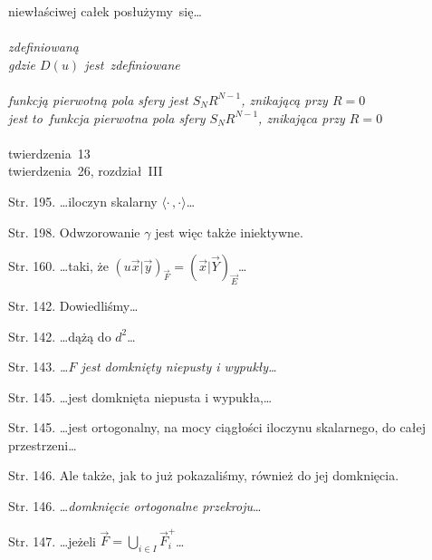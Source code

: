 \documentclass[a4paper,11pt]{article}
\numberwithin{equation}{section}
\begin{document}
\Powin niewłaściwej całek posłużymy~się\ldots \\
 \\
\Jest  \textit{zdefiniowaną} \\
\Powin \textit{gdzie $D( u )$ jest~zdefiniowane} \\
 \\
\Jest  \textit{funkcją pierwotną pola sfery jest $S_{ N } R^{ N - 1 }$,
  znikającą przy $R = 0$} \\
\Powin \textit{jest to~funkcja pierwotna pola sfery
  $S_{ N } R^{ N - 1 }$,
  znikająca przy $R = 0$} \\
 \\
\Jest  twierdzenia~13 \\
\Powin twierdzenia~26, rozdział~III \\

\vspace{\spaceTwo}
















\start Str. 195. \ldots iloczyn skalarny
$\langle \cdot \,, \cdot \rangle$\ldots

\start Str. 198. Odwzorowanie $\gamma$ jest więc także iniektywne.

\start Str. 160. \ldots taki, że
$( u\vec{ x } | \vec{ y } )_{ \vec{ F } } = ( \vec{ x } | \vec{ Y }
)_{ \vec{ E } }$\ldots

\start Str. 142. Dowiedliśmy\ldots

\start Str. 142. \ldots dążą do $d^{ 2 }$\ldots

\start Str. 143. \textit{\ldots$F$ jest domknięty niepusty i
  wypukły\ldots}

\start Str. 145. \ldots jest domknięta niepusta i wypukła,\ldots

\start Str. 145. \ldots jest ortogonalny, na mocy ciągłości iloczynu
skalarnego, do całej przestrzeni\ldots

\start Str. 146. Ale także, jak to już pokazaliśmy, również do jej
domknięcia.

\start Str. 146. \ldots\textit{domknięcie ortogonalne przekroju}\ldots

\start Str. 147. \ldots jeżeli
$\vec{ F } = \bigcup_{ i \in I } \vec{ F }_{ i }^{ + }$\ldots
\end{document}
